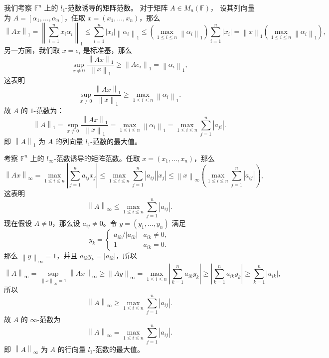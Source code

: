 \documentclass[fontset=none,zihao=-4]{Notes}
\newcommand{\norm}[1]{\left\lVert#1\right\rVert}
\begin{document}
\begin{example}
  我们考察 $\mathbb{F}^n$ 上的 $l_1$-范数诱导的矩阵范数。
  对于矩阵 $A\in M_n(\mathbb{F})$，
  设其列向量为 $A=[\alpha_1,\dots,\alpha_n]$，任取 $x=(x_1,\dots,x_n)$，那么
  \[
    \norm{Ax}_1=\norm{\sum_{i=1}^n x_i\alpha_i}_1\leq \sum_{i=1}^n|x_i|\norm{\alpha_i}_1
    \leq \left(\max_{1\leq i\leq n}\norm{\alpha_i}_1\right)\sum_{i=1}^n|x_i|
    =\norm{x}_1\left(\max_{1\leq i\leq n}\norm{\alpha_i}_1\right),
  \]
  另一方面，我们取 $x=e_i$ 是标准基，那么
  \[
    \sup_{x\neq 0}\frac{\norm{Ax}_1}{\norm{x}_1}  \geq \norm{Ae_i}_1=
    \norm{\alpha_i}_1,
  \]
  这表明
  \[
    \sup_{x\neq 0}\frac{\norm{Ax}_1}{\norm{x}_1}  \geq\max_{1\leq i\leq n}\norm{\alpha_i}_1.
  \]
  故 $A$ 的 $1$-范数为：
  \[
    \norm{A} _1=\sup_{x\neq 0}\frac{\norm{Ax}_1}{\norm{x}_1}=\max_{1\leq i\leq n}\norm{\alpha_i}_1
    =\max_{1\leq i\leq n}\sum_{j=1}^n|a_{ji}|.
  \]
  即 $\norm{A}_1$ 为 $A$ 的列向量 $l_1$-范数的最大值。
\end{example}

\begin{example}
  考察 $\mathbb{F}^n$ 上的 $l_\infty$-范数诱导的矩阵范数。任取
  $x=(x_1,\dots,x_n)$，那么
  \[
    \norm{Ax}_\infty=\max_{1\leq i\leq n}\left|\sum_{j=1}^n a_{ij}x_j\right|  
    \leq \max_{1\leq i\leq n}\sum_{j=1}^n|a_{ij}||x_j|\leq \norm{x}_\infty\left(\max_{1\leq i\leq n}\sum_{j=1}^n|a_{ij}|\right),
  \]
  这表明
  \[
    \norm{A}_\infty\leq  \max_{1\leq i\leq n}\sum_{j=1}^n|a_{ij}|. 
  \]
  现在假设 $A\ne 0$，那么设 $a_{ij}\neq 0$。令 $y=(y_1,\dots,y_n)$
  满足
  \[
    y_k=\begin{cases}
      \bar a_{ik}/|a_{ik}| & a_{ik}\neq 0,\\
      1 & a_{ik}=0.
    \end{cases}
  \]
  那么 $\norm y_{\infty}=1$，并且 $a_{ik}y_k=|a_{ik}|$，所以
  \[
    \norm{A}_\infty=\sup_{\norm{x}_\infty=1}\norm{Ax}_\infty\geq \norm{Ay}_\infty
    =\max_{1\leq i\leq n}\left|\sum_{k=1}^na_{ik}y_k\right|
    \geq \left|\sum_{k=1}^na_{ik}y_k\right|\geq \sum_{k=1}^n|a_{ik}|,
  \]
  所以
  \[
    \norm{A}_\infty \geq   \max_{1\leq i\leq n}\sum_{j=1}^n|a_{ij}|. 
  \]
  故 $A$ 的 $\infty$-范数为
  \[
    \norm{A}_\infty=\max_{1\leq i\leq n}\sum_{j=1}^n|a_{ij}|.  
  \]
  即 $\norm{A}_\infty$ 为 $A$ 的行向量 $l_1$-范数的最大值。
\end{example}
\end{document}
